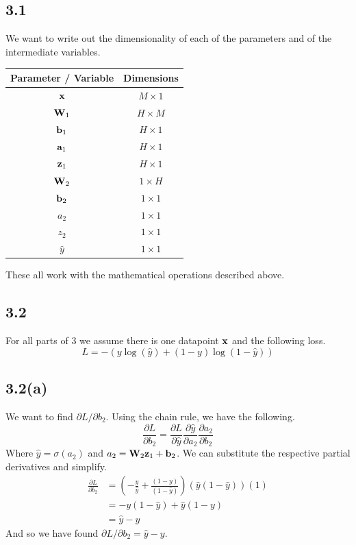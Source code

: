 \documentclass[submit]{harvardml}
\begin{document}
\subsection*{3.1}
We want to write out the dimensionality of each of the parameters and of the intermediate variables.
\begin{center}
    \begin{tabular}{ |c|c| } 
        \hline
        Parameter / Variable & Dimensions \\
        \hline
        \hline
        $\vb{x}$ & $M \times 1$ \\
        \hline
        $\vb{W}_1$ & $H \times M$ \\
        \hline
        $\vb{b}_1$ & $H \times 1$ \\
        \hline
        $\vb{a}_1$ & $H \times 1$ \\
        \hline
        $\vb{z}_1$ & $H \times 1$ \\
        \hline
        $\vb{W}_2$ & $1 \times H$ \\
        \hline
        $\vb{b}_2$ & $1 \times 1$ \\
        \hline
        $a_2$ & $1 \times 1$ \\
        \hline
        $z_2$ & $1 \times 1$ \\
        \hline
        $\hat{y}$ & $1 \times 1$ \\
        \hline
    \end{tabular}
\end{center}
These all work with the mathematical operations described above.

\subsection*{3.2}
For all parts of $3$ we assume there is one datapoint $\vb{x}$ and the following loss.
\begin{equation*}
    L = -(y \log(\hat{y}) + (1 - y) \log(1 - \hat{y}))
\end{equation*}

\subsection*{3.2(a)}
We want to find $\partial L / \partial b_2$. Using the chain rule, we have the following.
\begin{equation*}
    \frac{\partial L}{\partial b_2} = \frac{\partial L}{\partial \hat{y}} \frac{\partial \hat{y}}{\partial a_2} \frac{\partial a_2}{\partial b_2}
\end{equation*}
Where $\hat{y} = \sigma(a_2)$ and $a_2 = \vb{W}_2 \vb{z}_1 + \vb{b}_2$. We can substitute the respective partial derivatives and simplify.
\begin{align*}
    \frac{\partial L}{\partial b_2} &= \left( -\frac{y}{\hat{y}} + \frac{(1 - y)}{(1 - \hat{y})} \right) (\hat{y} (1 - \hat{y}) ) ( 1 ) \\
    &= -y(1 - \hat{y}) + \hat{y}(1 - y)\\
    &= \hat{y} - y
\end{align*}
And so we have found $\boxed{\partial L / \partial b_2 = \hat{y} - y}$.
\end{document}
